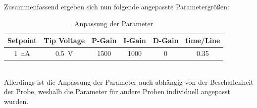 \documentclass[a4paper,twoside,final]{article}
\begin{document}
Zusammenfassend ergeben sich nun folgende angepasste Parametergrößen:
\begin{table}[ht]
	\centering
	\caption{Anpassung der Parameter}
	\label{tab:Parameteranpassung}
  \begin{tabular}{c c c c c c}
   \toprule
   Setpoint & Tip Voltage & P-Gain & I-Gain & D-Gain & time/Line\\
   \midrule
   \SI{1}{\nano\ampere} & \SI{0.5}{\volt} & 1500 & 1000 & 0 & 0.35\\
   \bottomrule
  \end{tabular}
\end{table}\\
Allerdings ist die Anpassung der Parameter auch abhängig von der Beschaffenheit der Probe, weshalb die Parameter für andere Proben individuell angepasst wurden.
\end{document}

